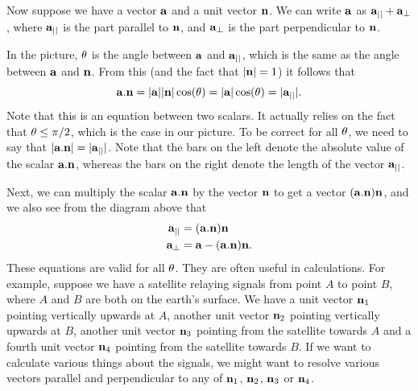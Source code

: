 \documentclass[reqno]{amsart}
\theoremstyle{definition}
\begin{document}
Now suppose we have a vector $\mathbf{a}$ and a unit vector $\mathbf{n}$.  We can
write $\mathbf{a}$ as $\mathbf{a}_{||}+\mathbf{a}_{\perp}$, where $\mathbf{a}_{||}$ is the part
parallel to $\mathbf{n}$, and $\mathbf{a}_\perp$ is the part perpendicular to
$\mathbf{n}$. 
\begin{center}
\end{center}
In the picture, $\theta$ is the angle between $\mathbf{a}$ and $\mathbf{a}_{||}$,
which is the same as the angle between $\mathbf{a}$ and $\mathbf{n}$.  From this
(and the fact that $|\mathbf{n}|=1$) it follows that
\[ \mathbf{a}.\mathbf{n} = |\mathbf{a}||\mathbf{n}|\cos(\theta) = |\mathbf{a}|\cos(\theta) = |\mathbf{a}_{||}|. \]
Note that this is an equation between two scalars.  It actually relies
on the fact that $\theta\leq\pi/2$, which is the case in our picture.
To be correct for all $\theta$, we need to say that
$|\mathbf{a}.\mathbf{n}|=|\mathbf{a}_{||}|$.  Note that the bars on the left denote the
absolute value of the scalar $\mathbf{a}.\mathbf{n}$, whereas the bars on the right
denote the length of the vector $\mathbf{a}_{||}$.

Next, we can multiply the scalar $\mathbf{a}.\mathbf{n}$ by the vector $\mathbf{n}$ to get
a vector $(\mathbf{a}.\mathbf{n})\mathbf{n}$, and we also see from the diagram above that
\begin{align*}
 \mathbf{a}_{||} &= (\mathbf{a}.\mathbf{n}) \mathbf{n} \\
 \mathbf{a}_\perp &= \mathbf{a} - (\mathbf{a}.\mathbf{n})\mathbf{n}. 
\end{align*}
These equations are valid for all $\theta$.  They are often useful in
calculations.  For example, suppose we have a satellite relaying
signals from point $A$ to point $B$, where $A$ and $B$ are both on the
earth's surface.  We have a unit vector $\mathbf{n}_1$ pointing vertically
upwards at $A$, another unit vector $\mathbf{n}_2$ pointing vertically
upwards at $B$, another unit vector $\mathbf{n}_3$ pointing from the
satellite towards $A$ and a fourth unit vector $\mathbf{n}_4$ pointing from
the satellite towards $B$.  If we want to calculate various things
about the signals, we might want to resolve various vectors parallel
and perpendicular to any of $\mathbf{n}_1$, $\mathbf{n}_2$, $\mathbf{n}_3$ or $\mathbf{n}_4$.
\end{document}
